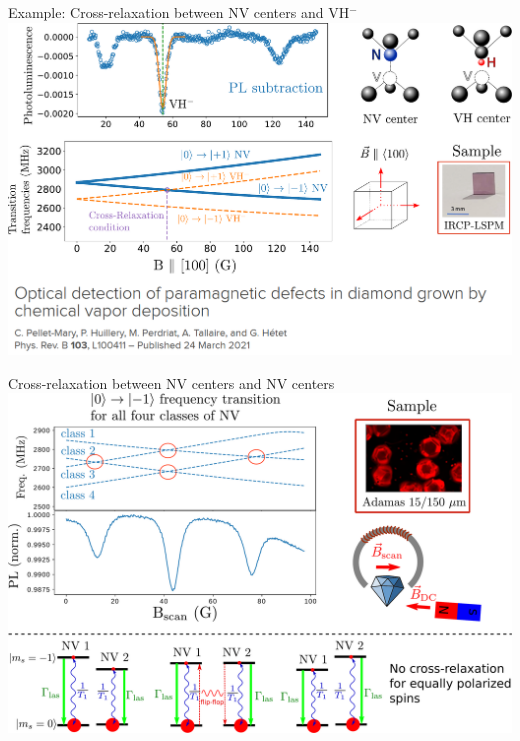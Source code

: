 \documentclass{beamer}
\begin{document}
\begin{frame}{Example: Cross-relaxation between NV centers and VH$^-$}
\centering
\includegraphics[width=\textwidth,height=0.85\textheight,keepaspectratio]{Slide_CR_VH}
\end{frame}

\begin{frame}{Cross-relaxation between NV centers and NV centers}
\centering
\includegraphics[width=\textwidth,height=0.85\textheight,keepaspectratio]{Slide_CR_adamas}
\end{frame}
\end{document}
